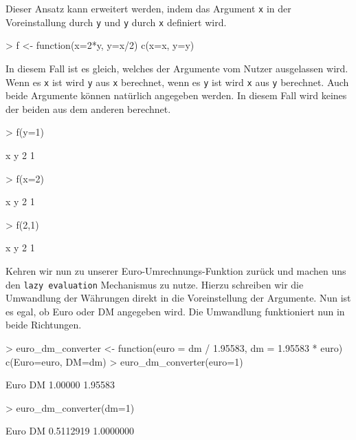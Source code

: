 \documentclass[12pt, a4paper,twoside,openany,x11names,svgnames]{memoir}
\begin{document}
Dieser Ansatz kann erweitert werden, indem das Argument \texttt{x} in der Voreinstallung durch \texttt{y} und \texttt{y} durch \texttt{x} definiert wird.

\begin{Schunk}
\begin{Sinput}
> f <- function(x=2*y, y=x/2){
   c(x=x, y=y)  
 }
\end{Sinput}
\end{Schunk}

In diesem Fall ist es gleich, welches der Argumente vom Nutzer ausgelassen wird. Wenn es \texttt{x} ist wird \texttt{y} aus \texttt{x} berechnet, wenn es \texttt{y} ist wird \texttt{x} aus \texttt{y} berechnet. Auch beide Argumente können natürlich angegeben werden. In diesem Fall wird keines der beiden aus dem anderen berechnet.

\begin{Schunk}
\begin{Sinput}
> f(y=1)
\end{Sinput}
\begin{Soutput}
x y 
2 1 
\end{Soutput}
\begin{Sinput}
> f(x=2)
\end{Sinput}
\begin{Soutput}
x y 
2 1 
\end{Soutput}
\begin{Sinput}
> f(2,1)
\end{Sinput}
\begin{Soutput}
x y 
2 1 
\end{Soutput}
\end{Schunk}

Kehren wir nun zu unserer Euro-Umrechnungs-Funktion zurück und machen uns den \texttt{lazy evaluation} Mechanismus zu nutze. Hierzu schreiben wir die Umwandlung der Währungen direkt in die Voreinstellung der Argumente. Nun ist es egal, ob Euro oder DM angegeben wird. Die Umwandlung funktioniert nun in beide Richtungen.

\begin{Schunk}
\begin{Sinput}
> euro_dm_converter <- function(euro = dm / 1.95583, 
                               dm = 1.95583 * euro){
   c(Euro=euro, DM=dm)
 }
> euro_dm_converter(euro=1)
\end{Sinput}
\begin{Soutput}
   Euro      DM 
1.00000 1.95583 
\end{Soutput}
\begin{Sinput}
> euro_dm_converter(dm=1)
\end{Sinput}
\begin{Soutput}
     Euro        DM 
0.5112919 1.0000000 
\end{Soutput}
\end{Schunk}
\end{document}
